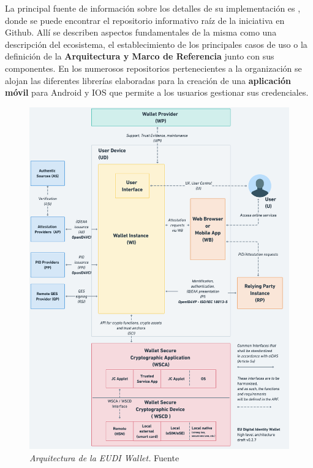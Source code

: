 \documentclass[../main.tex]{subfiles}
\begin{document}
La principal fuente de información sobre los detalles de su implementación es \cite{EUDigitalIdentityWalletArchitecture}, donde se puede encontrar el repositorio informativo raíz de la iniciativa en \Gls{Github}. Allí se describen aspectos fundamentales de la misma como una descripción del ecosistema, el establecimiento de los principales casos de uso o la definición de la \textbf{Arquitectura y Marco de Referencia} junto con sus componentes. En los numerosos repositorios pertenecientes a la organización se alojan las diferentes librerías elaboradas para la creación de una \textbf{aplicación móvil} para Android y IOS que permite a los usuarios gestionar sus credenciales.
\\

\begin{figure}[htbp]
    \centering
    \includegraphics[width=0.55\linewidth]{images/EUDI_Ecosystem.png}
    \caption{\textit{Arquitectura de la \acrshort{EUDI Wallet}.} Fuente \cite{EUDigitalIdentityWalletArchitecture}}
    \label{fig:EUDI_Ecosystem}
\end{figure}
\end{document}
